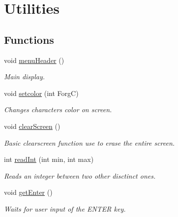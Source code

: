 \hypertarget{group___utilities}{}\section{Utilities}
\label{group___utilities}
\subsection*{Functions}
\begin{DoxyCompactItemize}
\item 
void \hyperlink{group___utilities_ga1f9f149ec48673e7862677749634b84f}{menu\+Header} ()
\begin{DoxyCompactList}\small\item\em Main display. \end{DoxyCompactList}\item 
void \hyperlink{group___utilities_gafacdcb839eb529bcd4fcf232bc342a8f}{setcolor} (int ForgC)
\begin{DoxyCompactList}\small\item\em Changes characters color on screen. \end{DoxyCompactList}\item 
\mbox{\label{group___utilities_ga9d7e8af417b6d543da691e9c0e2f6f9f}} 
void \hyperlink{group___utilities_ga9d7e8af417b6d543da691e9c0e2f6f9f}{clear\+Screen} ()
\begin{DoxyCompactList}\small\item\em Basic clearscreen function use to erase the entire screen. \end{DoxyCompactList}\item 
int \hyperlink{group___utilities_ga8c6fba7e77f37f05bdf1369f9e89ca0d}{read\+Int} (int min, int max)
\begin{DoxyCompactList}\small\item\em Reads an integer between two other disctinct ones. \end{DoxyCompactList}\item 
\mbox{\label{group___utilities_gaee81db935b67b9fad8c5f25b02ba935e}} 
void \hyperlink{group___utilities_gaee81db935b67b9fad8c5f25b02ba935e}{get\+Enter} ()
\begin{DoxyCompactList}\small\item\em Waits for user input of the E\+N\+T\+ER key. \end{DoxyCompactList}\end{DoxyCompactItemize}
